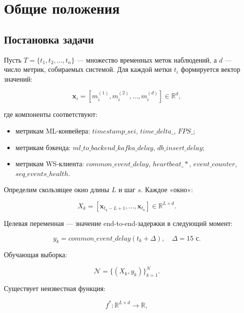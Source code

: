 \chapter{Общие положения}

\section{Постановка задачи}

Пусть $T=\{t_1, t_2, \ldots, t_n\}$ --- множество временных меток наблюдений, а $d$ --- число метрик, собираемых системой. Для каждой метки $t_i$ формируется вектор значений:

\begin{equation}
	\mathbf{x}_i = [m^{(1)}_i, m^{(2)}_i, \ldots, m^{(d)}_i] \in \mathbb{R}^d,
\end{equation}

где компоненты соответствуют:
\begin{itemize}
	\item метрикам ML-конвейера: $timestamp\_sei$, $time\_delta\_$, $FPS\_$;
	\item метрикам бэкенда: $ml\_to\_backend\_kafka\_delay$, $db\_insert\_delay$;
	\item метрикам WS-клиента: $common\_event\_delay$, $heartbeat\_*$, $event\_counter$, $seq\_events\_health$.
\end{itemize}

Определим скользящее окно длины $L$ и шаг $s$. Каждое «окно»:

\begin{equation}
	X_k = [\mathbf{x}_{t_k - L + 1}, \ldots, \mathbf{x}_{t_k}] \in \mathbb{R}^{L \times d}.
\end{equation}

Целевая переменная --- значение end-to-end-задержки в следующий момент:

\begin{equation}
	y_k = common\_event\_delay(t_k + \Delta),\quad \Delta = 15\text{ с}.
\end{equation}

Обучающая выборка:

\begin{equation}
	\mathcal{N} = \{(X_k, y_k)\}_{k=1}^{N}.
\end{equation}

Существует неизвестная функция:

\begin{equation}
	f^*: \mathbb{R}^{L \times d} \to \mathbb{R},
\end{equation}


